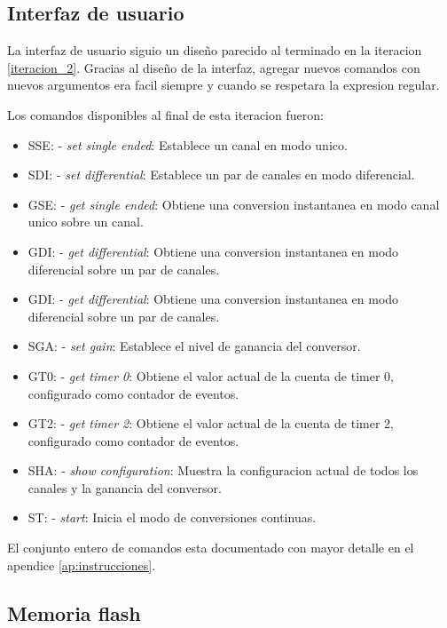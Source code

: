 

\subsection{Interfaz de usuario} %
\label{it5:sub:interfaz_de_usuario}

La interfaz de usuario siguio un diseño parecido al terminado en la iteracion \ref{iteracion_2}. Gracias al diseño de la interfaz, agregar nuevos comandos con nuevos argumentos era facil siempre y cuando se respetara la expresion regular.

Los comandos disponibles al final de esta iteracion fueron:

\begin{itemize}
  \item SSE: - \textit{set single ended}: Establece un canal en modo unico.
  \item SDI: - \textit{set differential}: Establece un par de canales en modo diferencial.
  \item GSE: - \textit{get single ended}: Obtiene una conversion instantanea en modo canal unico sobre un canal.
  \item GDI: - \textit{get differential}: Obtiene una conversion instantanea en modo diferencial sobre un par de canales.
  \item GDI: - \textit{get differential}: Obtiene una conversion instantanea en modo diferencial sobre un par de canales.
  \item SGA: - \textit{set gain}: Establece el nivel de ganancia del conversor.
  \item GT0: - \textit{get timer 0}: Obtiene el valor actual de la cuenta de timer 0, configurado como contador de eventos.
  \item GT2: - \textit{get timer 2}: Obtiene el valor actual de la cuenta de timer 2, configurado como contador de eventos.
  \item SHA: - \textit{show configuration}: Muestra la configuracion actual de todos los canales y la ganancia del conversor.
  \item ST: - \textit{start}: Inicia el modo de conversiones continuas.
\end{itemize}

El conjunto entero de comandos esta documentado con mayor detalle en el apendice \ref{ap:instrucciones}.

\subsection{Memoria flash} %
\label{it5:sub:memoria_flash}

